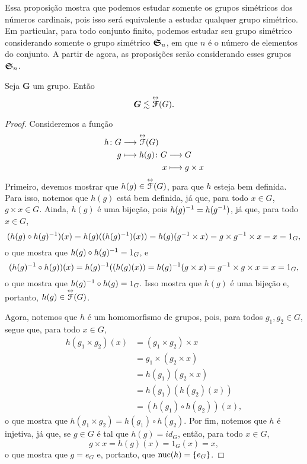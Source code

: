 	Essa proposição mostra que podemos estudar somente os grupos simétricos dos números cardinais, pois isso será equivalente a estudar qualquer grupo simétrico. Em particular, para todo conjunto finito, podemos estudar seu grupo simétrico considerando somente o grupo simétrico $\bm{\mathfrak{S}}_n$, em que $n$ é o número de elementos do conjunto. A partir de agora, as proposições serão considerando esses grupos $\bm{\mathfrak{S}}_n$.

\begin{theorem}
	Seja $\bm G$ um grupo. Então
	\begin{equation*}
	\bm G \lesssim \overset{\leftrightarrow}{\bm{\mathcal{F}}}(G).
	\end{equation*}
\end{theorem}
\begin{proof}
	Consideremos a função
	\begin{align*}
	\func{h}{G}{\Iso{\Func}(G)}{g}{
		\begin{aligned}[t]
		\func{h(g)}{G}{G}{x}{g \times x}
		\end{aligned}
	}
	\end{align*}
Primeiro, devemos mostrar que $h(g) \in \overset{\leftrightarrow}{\mathcal{F}}(G)$, para que $h$ esteja bem definida. Para isso, notemos que $h(g)$ está bem definida, já que, para todo $x \in G$, $g \times x \in G$. Ainda, $h(g)$ é uma bijeção, pois $h(g)^{-1} = h(g^{-1})$, já que, para todo $x \in G$,
	\begin{equation*}
	(h(g) \circ h(g)^{-1})(x) = h(g)((h(g)^{-1})(x)) = h(g)(g^{-1} \times x) = g \times g^{-1} \times x = x = 1_G,
	\end{equation*}
o que mostra que $h(g) \circ h(g)^{-1} = 1_G$, e
	\begin{equation*}
	(h(g)^{-1} \circ h(g))(x) = h(g)^{-1}((h(g)(x)) = h(g)^{-1}(g \times x) = g^{-1} \times g \times x = x = 1_G,
	\end{equation*}
o que mostra que $h(g)^{-1} \circ h(g) = 1_G$. Isso mostra que $h(g)$ é uma bijeção e, portanto, $h(g) \in \overset{\leftrightarrow}{\mathcal{F}}(G)$.

	Agora, notemos que $h$ é um homomorfismo de grupos, pois, para todos $g_1,g_2 \in G$, segue que, para todo $x \in G$,
	\begin{align*}
	h(g_1 \times g_2)(x) &= (g_1 \times g_2) \times x \\
	&= g_1 \times (g_2 \times x) \\
	&= h(g_1)(g_2 \times x) \\
	&= h(g_1)(h(g_2)(x)) \\
	&= (h(g_1) \circ h(g_2))(x),
	\end{align*}
o que mostra que $h(g_1 \times g_2) = h(g_1) \circ h(g_2)$. Por fim, notemos que $h$ é injetiva, já que, se $g \in G$ é tal que $h(g)=id_G$, então, para todo $x \in G$,
	\begin{equation*}
	g \times x = h(g)(x) = 1_G(x) = x,
	\end{equation*}
o que mostra que $g=e_G$ e, portanto, que $\operatorname{nuc}(h)=\{e_G\}$.
\end{proof}

